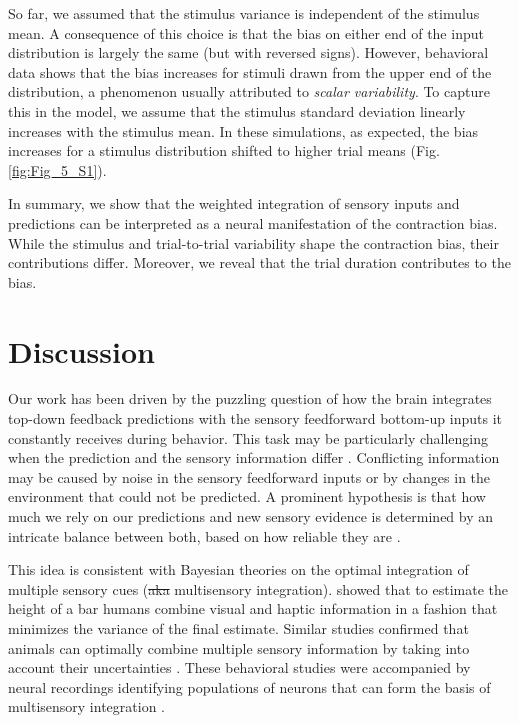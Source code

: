 \documentclass[10pt,a4paper]{article}
\providecommand{\DIFdeltex}[1]{{\protect\color{red}\sout{#1}}}                      %
\providecommand{\DIFdelbegin}{} %
\providecommand{\DIFdelend}{} %
\providecommand{\DIFdel}[1]{\texorpdfstring{\DIFdeltex{#1}}{}} %
\newcommand{\DIFscaledelfig}{0.5}
\newlength{\DIFdelgraphicswidth} %
\newlength{\DIFdelgraphicsheight} %
\newcommand{\DIFdelincludegraphics}[2][]{%
\sbox{\DIFdelgraphicsbox}{\DIFOincludegraphics[#1]{#2}}%
\settoboxwidth{\DIFdelgraphicswidth}{\DIFdelgraphicsbox} %
\settoboxtotalheight{\DIFdelgraphicsheight}{\DIFdelgraphicsbox} %
\scalebox{\DIFscaledelfig}{%
\parbox[b]{\DIFdelgraphicswidth}{\usebox{\DIFdelgraphicsbox}\\[-\baselineskip] \rule{\DIFdelgraphicswidth}{0em}}\llap{\resizebox{\DIFdelgraphicswidth}{\DIFdelgraphicsheight}{%
\setlength{\unitlength}{\DIFdelgraphicswidth}%
\begin{picture}(1,1)%
\thicklines\linethickness{2pt} %
{\color[rgb]{1,0,0}\put(0,0){\framebox(1,1){}}}%
{\color[rgb]{1,0,0}\put(0,0){\line( 1,1){1}}}%
{\color[rgb]{1,0,0}\put(0,1){\line(1,-1){1}}}%
\end{picture}%
}\hspace*{3pt}}} %
} %
\DeclareRobustCommand{\DIFdelbegin}{\DIFOdelbegin \let\includegraphics\DIFdelincludegraphics} %
\DeclareRobustCommand{\DIFdelend}{\DIFOaddend \let\includegraphics\DIFOincludegraphics} %
\begin{document}
So far, we assumed that the stimulus variance is independent of the stimulus mean. A consequence of this choice is that the bias on either end of the input distribution is largely the same (but with reversed signs). However, behavioral data \citep[see, e.g.][]{rakitin1998scalar} shows that the bias increases for stimuli drawn from the upper end of the distribution, a phenomenon usually attributed to \textit{scalar variability}. To capture this in the model, we assume that the stimulus standard deviation linearly increases with the stimulus mean. In these simulations, as expected, the bias increases for a stimulus distribution shifted to higher trial means (Fig. \ref{fig:Fig_5_S1}).

In summary, we show that the weighted integration of sensory inputs and predictions can be interpreted as a neural manifestation of the contraction bias. While the stimulus and trial-to-trial variability shape the contraction bias, their contributions differ. Moreover, we reveal that the trial duration contributes to the bias.


\section*{Discussion}
%
Our work has been driven by the puzzling question of how the brain integrates top-down feedback predictions with the sensory feedforward bottom-up inputs it constantly receives during behavior. This task may be particularly challenging when the prediction and the sensory information differ \citep{han2023behavior}. Conflicting information may be caused by noise in the sensory feedforward inputs or by changes in the environment that could not be predicted. A prominent hypothesis is that how much we rely on our predictions and new sensory evidence is determined by an intricate balance between both, based on how reliable they are \citep[see e.g.][]{kording2004bayesian, yon2021precision}. 

This idea is consistent with Bayesian theories on the optimal integration of multiple sensory cues (\DIFdelbegin \DIFdel{aka }\DIFdelend multisensory integration). \cite{ernst2002humans} showed that to estimate the height of a bar humans combine visual and haptic information in a fashion that minimizes the variance of the final estimate. Similar studies confirmed that animals can optimally combine multiple sensory information by taking into account their uncertainties \citep{battaglia2003bayesian, kording2004bayesian, alais2004ventriloquist, rowland2007bayesian, gu2008neural, fetsch2012neural}. These behavioral studies were accompanied by neural recordings identifying populations of neurons that can form the basis of multisensory integration \citep{wallace1998multisensory, gu2008neural, fetsch2012neural}.
\end{document}
